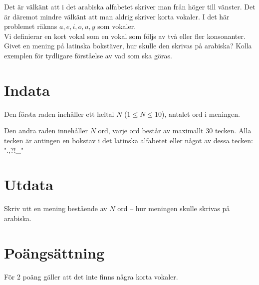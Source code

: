 

Det är välkänt att i det arabiska alfabetet skriver man från höger till vänster. Det är däremot mindre välkänt att man aldrig skriver korta vokaler. I det här problemet räknas $a,e,i,o,u,y$ som vokaler.\\ Vi definierar en kort vokal som en vokal som följs av två eller fler konsonanter.\\ Givet en mening på latinska bokstäver, hur skulle den skrivas på arabiska? Kolla exemplen för tydligare förståelse av vad som ska göras.


\section*{Indata}
Den första raden inehåller ett heltal $N$ ($1 \le N \le 10$), antalet ord i meningen.

Den andra raden innehåller $N$ ord, varje ord består av maximallt 30 tecken. Alla tecken är antingen en bokstav i det latinska alfabetet eller något av dessa tecken: ".,?!\_"

\section*{Utdata}
Skriv utt en mening bestående av $N$ ord -- hur meningen skulle skrivas på arabiska.
\section*{Poängsättning}
För 2 poäng gäller att det inte finns några korta vokaler. \\
